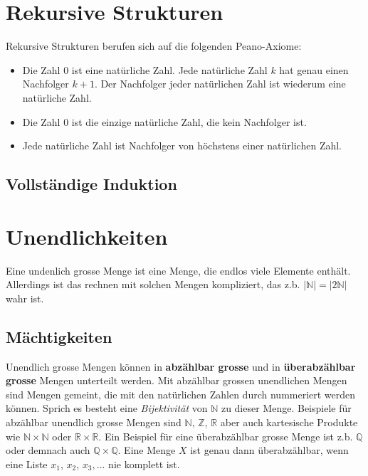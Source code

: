 \documentclass{article}
\begin{document}
\section{Rekursive Strukturen}
Rekursive Strukturen berufen sich auf die folgenden Peano-Axiome:
\begin{itemize}
		\item Die Zahl 0 ist eine natürliche Zahl. Jede natürliche Zahl $k$ hat genau einen Nachfolger $k+1$. Der Nachfolger jeder natürlichen Zahl ist wiederum eine natürliche Zahl.
		\item Die Zahl 0 ist die einzige natürliche Zahl, die kein Nachfolger ist.
		\item Jede natürliche Zahl ist Nachfolger von höchstens einer natürlichen Zahl.
\end{itemize}

\subsection{Vollständige Induktion}


\section{Unendlichkeiten}
Eine undenlich grosse Menge ist eine Menge, die endlos viele Elemente enthält. Allerdings ist das rechnen mit solchen Mengen kompliziert, das z.b. \(| \mathbb{N}| = |2 \mathbb{N}|\) wahr ist.
\subsection{Mächtigkeiten}
Unendlich grosse Mengen können in \textbf{abzählbar grosse} und in \textbf{überabzählbar grosse} Mengen unterteilt werden. Mit abzählbar grossen unendlichen Mengen sind Mengen gemeint, die mit den natürlichen Zahlen durch nummeriert werden können. Sprich es besteht eine \textit{Bijektivität} von \( \mathbb{N}\) zu dieser Menge. Beispiele für abzählbar unendlich grosse Mengen sind \( \mathbb{N}\), \( \mathbb{Z}\), \( \mathbb{R}\) aber auch kartesische Produkte wie \( \mathbb{N}\times \mathbb{N}\) oder \( \mathbb{R}\times \mathbb{R}\). Ein Beispiel für eine überabzählbar grosse Menge ist z.b. \( \mathbb{Q}\) oder demnach auch \( \mathbb{Q}\times \mathbb{Q}\). Eine Menge \(X\) ist genau dann überabzählbar, wenn eine Liste \(x_1\), \( x_2\), \(x_3, ...\) nie komplett ist.
\newpage
\end{document}
